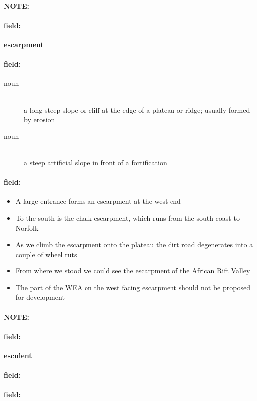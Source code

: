 \documentclass[12pt]{article}
\newenvironment{note}{\paragraph{NOTE:}}{}
\newenvironment{field}{\paragraph{field:}}{}
\begin{document}
\begin{note}
\begin{field}
\textbf{\large escarpment}
\end{field}


\begin{field}
\begin{description}
\item[noun] \hfill \\ 
a long steep slope or cliff at the edge of a plateau or ridge; usually formed by erosion

\item[noun] \hfill \\ 
a steep artificial slope in front of a fortification

\end{description}
\end{field}

\begin{field}
\begin{itemize}
\item A large entrance forms an escarpment at the west end
\item To the south is the chalk escarpment, which runs from the south coast to Norfolk
\item As we climb the escarpment onto the plateau the dirt road degenerates into a couple of wheel ruts
\item From where we stood we could see the escarpment of the African Rift Valley
\item The part of the WEA on the west facing escarpment should not be proposed for development
\end{itemize}
\end{field}
\end{note}
\begin{note}
\begin{field}
\textbf{\large esculent}
\end{field}


\begin{field}
\end{field}

\begin{field}
\end{field}
\end{note}
\end{document}
